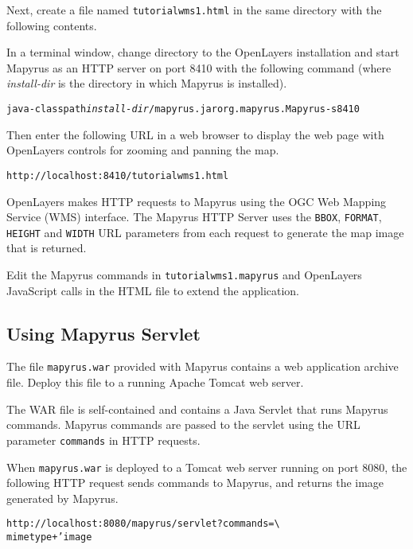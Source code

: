 

Next, create a file named \texttt{tutorialwms1.html} in the
same directory with the following contents.



In a terminal window, change directory to the OpenLayers installation and
start Mapyrus as an HTTP server on port 8410 with the following command
(where \textit{install-dir} is the directory in which Mapyrus is installed).

\begin{alltt}
java -classpath \textit{install-dir}/mapyrus.jar org.mapyrus.Mapyrus -s 8410
\end{alltt}

Then enter the following URL in a web browser to display the web page
with OpenLayers controls for zooming and panning the map.

\begin{verbatim}
http://localhost:8410/tutorialwms1.html
\end{verbatim}

OpenLayers makes HTTP requests to Mapyrus using the
OGC Web Mapping Service (WMS) interface.
The Mapyrus HTTP Server uses the \texttt{BBOX},
\texttt{FORMAT}, \texttt{HEIGHT} and \texttt{WIDTH} URL parameters
from each request to generate the map image that is returned.

Edit the Mapyrus commands in \texttt{tutorialwms1.mapyrus}
and OpenLayers JavaScript calls in the
HTML file to extend the application.

\subsection{Using Mapyrus Servlet}

The file
\texttt{mapyrus.war}
provided with Mapyrus contains a web application archive file.
Deploy this file to a running Apache Tomcat web server.

The WAR file is self-contained and contains a Java
Servlet that runs Mapyrus commands.  Mapyrus commands are
passed to the servlet using the URL parameter \texttt{commands}
in HTTP requests.

When \texttt{mapyrus.war} is deployed to a Tomcat web server running on
port 8080, the following HTTP request sends commands to Mapyrus, and
returns the image generated by Mapyrus.

\begin{alltt}
http://localhost:8080/mapyrus/servlet?commands= \textbackslash
  mimetype+'image%2Fpng'%3B+newpage+'png'%2C+'-'%2C+50%2C+50%2C+'background%3Dred'
\end{alltt}

